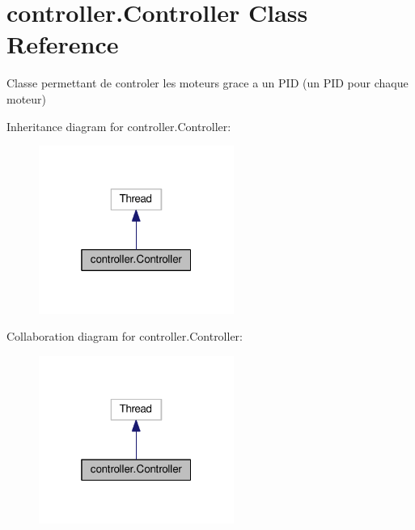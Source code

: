 \hypertarget{classcontroller_1_1Controller}{}\section{controller.\+Controller Class Reference}
\label{classcontroller_1_1Controller}


Classe permettant de controler les moteurs grace a un P\+ID (un P\+ID pour chaque moteur)  




Inheritance diagram for controller.\+Controller\+:\nopagebreak
\begin{figure}[H]
\begin{center}
\leavevmode
\includegraphics[width=181pt]{classcontroller_1_1Controller__inherit__graph}
\end{center}
\end{figure}


Collaboration diagram for controller.\+Controller\+:\nopagebreak
\begin{figure}[H]
\begin{center}
\leavevmode
\includegraphics[width=181pt]{classcontroller_1_1Controller__coll__graph}
\end{center}
\end{figure}
